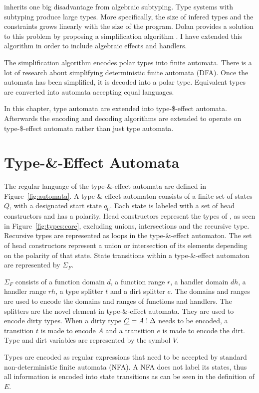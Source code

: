 \core inherits one big disadvantage from algebraic subtyping. Type systems with subtyping produce large types. More specifically, the size of infered types and the constraints grows linearly with the size of the program. Dolan provides a solution to this problem by proposing a simplification algorithm \cite{dolan2017algebraic}. I have extended this algorithm in order to include algebraic effects and handlers. 

The simplification algorithm encodes polar types into finite automata. There is a lot of research about simplifying deterministic finite automata (DFA). Once the automata has been simplified, it is decoded into a polar type. Equivalent types are converted into automata accepting equal languages.

In this chapter, type automata are extended into type-\$-effect automata. Afterwards the encoding and decoding algorithms are extended to operate on type-\$-effect automata rather than just type automata.

\section{Type-\&-Effect Automata}
The regular language of the type-\&-effect automata are defined in Figure~\ref{fig:automata}. A type-\&-effect automaton consists of a finite set of states $Q$, with a designated start state $q_0$. Each state is labeled with a set of head constructors and has a polarity. Head constructors represent the types of \core, as seen in Figure~\ref{fig:types:core}, excluding unions, intersections and the recursive type. Recursive types are represented as loops in the type-\&-effect automaton. The set of head constructors represent a union or intersection of its elements depending on the polarity of that state. State transitions within a type-\&-effect automaton are represented by $\Sigma_F$. 

$\Sigma_F$ consists of a function domain $d$, a function range $r$, a handler domain $dh$, a handler range $rh$, a type splitter $t$ and a dirt splitter $e$. The domains and ranges are used to encode the domains and ranges of functions and handlers. The splitters are the novel element in type-\&-effect automata. They are used to encode dirty types. When a dirty type $\underline{C} = A \mathrel{!} \Delta$ needs to be encoded, a transition $t$ is made to encode $A$ and a transition $e$ is made to encode the dirt. Type and dirt variables are represented by the symbol $V$. 

Types are encoded as regular expressions that need to be accepted by standard non-deterministic finite automata (NFA). A NFA does not label its states, thus all information is encoded into state transitions as can be seen in the definition of $E$.  

